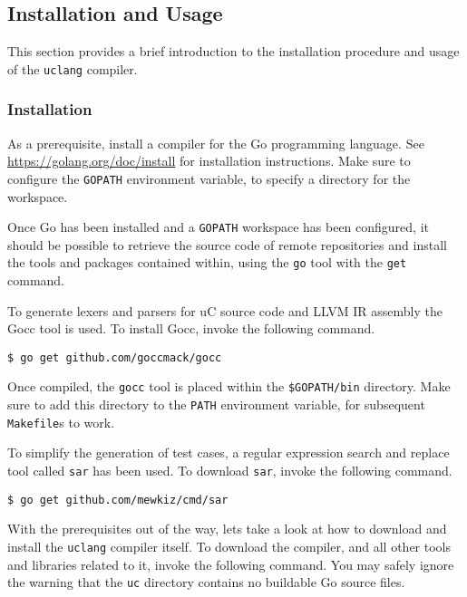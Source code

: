 \subsection{Installation and Usage}
\label{sec:installation_and_usage}

This section provides a brief introduction to the installation procedure and usage of the \texttt{uclang} compiler.

\subsubsection{Installation}

As a prerequisite, install a compiler for the Go programming language. See \url{https://golang.org/doc/install} for installation instructions. Make sure to configure the \texttt{GOPATH} environment variable, to specify a directory for the workspace.

Once Go has been installed and a \texttt{GOPATH} workspace has been configured, it should be possible to retrieve the source code of remote repositories and install the tools and packages contained within, using the \texttt{go} tool with the \texttt{get} command.

To generate lexers and parsers for uC source code and LLVM IR assembly the Gocc tool is used. To install Gocc, invoke the following command.

\begin{verbatim}
$ go get github.com/goccmack/gocc
\end{verbatim}

Once compiled, the \texttt{gocc} tool is placed within the \verb+$GOPATH/bin+ directory. Make sure to add this directory to the \texttt{PATH} environment variable, for subsequent \texttt{Makefile}s to work.

To simplify the generation of test cases, a regular expression search and replace tool called \texttt{sar} has been used. To download \texttt{sar}, invoke the following command.

\begin{verbatim}
$ go get github.com/mewkiz/cmd/sar
\end{verbatim}

With the prerequisites out of the way, lets take a look at how to download and install the \texttt{uclang} compiler itself. To download the compiler, and all other tools and libraries related to it, invoke the following command. You may safely ignore the warning that the \texttt{uc} directory contains no buildable Go source files.

